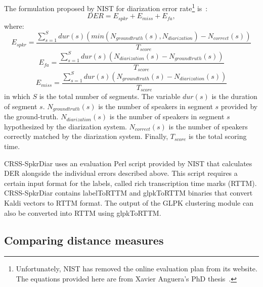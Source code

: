 The formulation proposed by NIST for diarization error rate\footnote{Unfortunately, NIST has removed the online evaluation plan from its website. The equations provided here are from Xavier Anguera's PhD thesis~\cite{anguera2007phd}.} is~\cite{anguera2012DRZreview}:
\begin{equation}
DER = E_{spkr} + E_{miss} + E_{fa}, 
\end{equation}
where: 
\begin{equation}
E_{spkr} = \frac{\sum\limits_{s=1}^{S} dur(s)(min(N_{groundtruth}(s),N_{diarization})-N_{correct}(s))}{T_{score}}
\end{equation}
\begin{equation}
E_{fa} = \frac{\sum\limits_{s=1}^S dur(s)(N_{diarization}(s)-N_{groundtruth}(s))}{T_{score}}
\end{equation}
\begin{equation}
E_{miss} = \frac{\sum\limits_{s=1}^S dur(s)(N_{groundtruth}(s) - N_{diarization}(s))}{T_{score}}
\end{equation}
in which $S$ is the total number of segments. The variable $dur(s)$ is the duration of segment $s$. $N_{groundtruth}(s)$ is the number of speakers in segment $s$ provided by the ground-truth. 
$N_{diarization}(s)$ is the number of speakers in segment $s$ hypothesized by the diarization system. 
$N_{correct}(s)$ is the number of speakers correctly matched by the diarization system. 
Finally, $T_{score}$ is the total scoring time. 

CRSS-SpkrDiar uses an evaluation Perl script provided by NIST that calculates DER alongside the individual errors described above. 
This script requires a certain input format for the labels, called rich transcription time marks (RTTM). 
CRSS-SpkrDiar contains labelToRTTM and glpkToRTTM binaries that convert Kaldi vectors to RTTM format. 
The output of the GLPK clustering module can also be converted into RTTM using glpkToRTTM. 

\subsection{Comparing distance measures}

